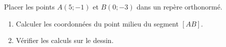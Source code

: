 
\begin{exercice}\label{exosmath-0485}

    Placer les points \( A(5;-1)\) et \( B(0;-3)\) dans un repère orthonormé.
    \begin{enumerate}
        \item
            Calculer les coordonnées du point milieu du segment \( [AB]\).
        \item
            Vérifier les calculs sur le dessin.
    \end{enumerate}


\end{exercice}
